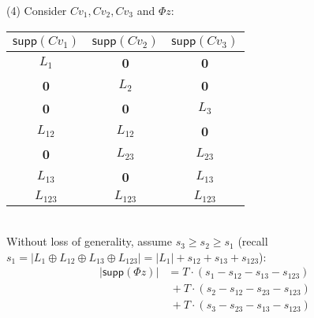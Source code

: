 {(4) Consider $Cv_1, Cv_2, Cv_3$ and $\Phi z$:\\

\begin{tabular}[!b]{ccc} 
  \hline
  $\textsf{supp}(Cv_1)$ &   $\textsf{supp}(Cv_2)$ &   $\textsf{supp}(Cv_3)$\\
  \hline
	$ L_1$ & {\bf 0 } & {\bf 0} \\
  {\bf 0}  &  $L_2$ & {\bf 0} \\
  {\bf 0} & {\bf 0} &  $L_3$ \\
 $ L_{12}$ &  $ L_{12}$ & {\bf 0 } \\
  {\bf 0} &  $ L_{23}$ &    $ L_{23}$ \\
 $ L_{13}$ & {\bf 0} &   $ L_{13}$  \\
$L_{123}$ &   $L_{123}$ &  $L_{123}$\\
  \hline
\end{tabular}%
\bigskip\\
\noindent Without loss of generality, assume $s_3\ge s_2 \ge s_1$ (recall $s_1 = \vert L_1 \oplus L_{12} \oplus L_{13} \oplus L_{123} \vert = \lvert L_1 \rvert + s_{12} + s_{13} + s_{123}$):
\begin{equation}
\begin{aligned}
	\lvert \textsf{supp}(\Phi z) \rvert  &=  T \cdot(s_1 - s_{12} - s_{13} - s_{123}) \\&~ + T \cdot(s_2 - s_{12} - s_{23} - s_{123}) \\&~ + T \cdot(s_3 - s_{23} - s_{13} - s_{123}) \\ 

\end{aligned}
\end{equation}}
